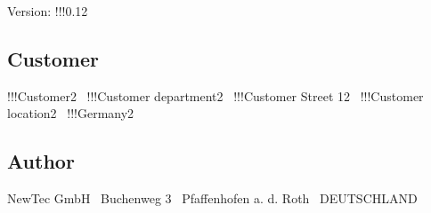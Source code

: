 Version\+: !!!0.12

\subsection*{Customer}

!!!\+Customer2~\newline
!!!\+Customer department2~\newline
!!!\+Customer Street 12~\newline
!!!\+Customer location2~\newline
!!!\+Germany2

\subsection*{Author}

New\+Tec Gmb\+H~\newline
Buchenweg 3~ Pfaffenhofen a. d. Roth~\newline
D\+E\+U\+T\+S\+C\+H\+L\+A\+N\+D 